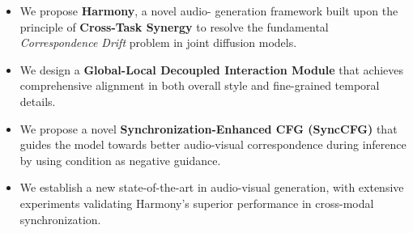 
\begin{itemize}
    \item We propose \textbf{Harmony}, a novel  audio- generation framework built upon the principle of \textbf{Cross-Task Synergy} to resolve the fundamental \textit{Correspondence Drift} problem in joint diffusion models.
    \item We design a \textbf{Global-Local Decoupled Interaction Module} that achieves comprehensive alignment in both overall style and fine-grained temporal details.
    \item We propose a novel \textbf{Synchronization-Enhanced CFG (SyncCFG)} that guides the model towards better audio-visual correspondence during inference by using %
      condition as negative guidance.
    \item We establish a new state-of-the-art in audio-visual generation, with extensive experiments validating Harmony's superior performance in cross-modal synchronization.
\end{itemize}